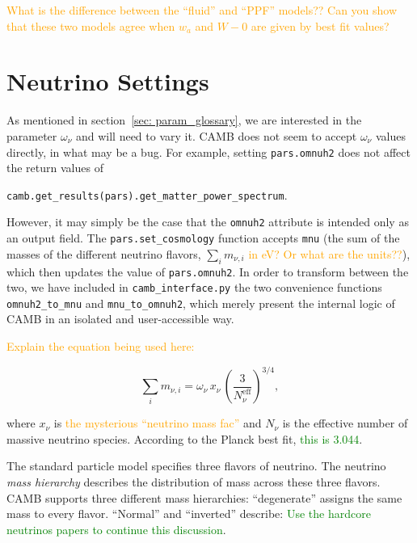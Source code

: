 \textcolor{orange}{What is the difference between the ``fluid'' and ``PPF''
models?? Can you show that these two models agree when $w_a$ and $W-0$ are
given by best fit values?}

\section{Neutrino Settings}


As mentioned in section~\ref{sec: param_glossary}, we are interested in the
parameter $\omega_\nu$ and will need to vary it. CAMB does not seem to accept
$\omega_\nu$ values directly, in what may be a bug. For example, setting
\verb|pars.omnuh2| does not affect the return values of

\verb|camb.get_results(pars).get_matter_power_spectrum|.

However, it may simply be the case that the \verb|omnuh2| attribute is
intended only as an output field. The \verb|pars.set_cosmology| function
accepts \verb|mnu| (the sum of the masses of the different neutrino flavors,
$\sum_i m_{\nu, i}$ \textcolor{orange}{in eV? Or what are the units??}),
which then updates the value of \verb|pars.omnuh2|.
In order to transform between the two, we have included in
\verb|camb_interface.py| the two convenience functions
\verb|omnuh2_to_mnu| and \verb|mnu_to_omnuh2|, which merely present the 
internal logic of CAMB in an isolated and user-accessible way.

\textcolor{orange}{Explain the equation being used here:}

\begin{equation}
\sum_i m_{\nu, i}
=
\omega_\nu \, x_\nu \, \left( \frac{3}{N_\nu^\text{eff}} \right)^{3/4}
,\end{equation}

where $x_\nu$ is \textcolor{orange}{the mysterious ``neutrino mass fac''} and
$N_\nu$ is the effective number of massive neutrino species. According to the
Planck best fit, \textcolor{green}{this is 3.044}.

The standard particle model specifies three flavors of neutrino. The neutrino
\textit{mass hierarchy} describes the distribution of mass across these three
flavors. CAMB supports three different mass hierarchies: ``degenerate''
assigns the same mass to every flavor. ``Normal'' and ``inverted'' describe:
\textcolor{green}{Use the hardcore neutrinos papers to continue this
discussion}.

